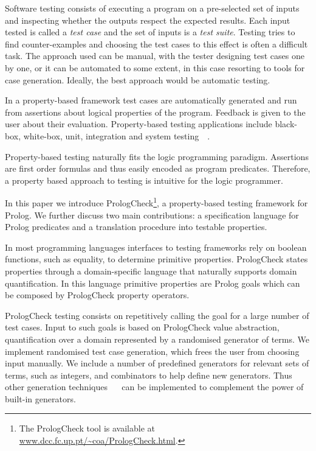 \documentclass[runningheads,a4paper]{llncs}
\newcommand{\Prolog}[0]{{\sf Prolog}}
\newcommand{\plqc}[0]{{\sf PrologCheck}}
\begin{document}
Software testing consists of executing a program on
a pre-selected set of inputs and inspecting whether the outputs
respect the expected results.
%
Each input tested is called a \emph{test case} and the set of inputs is
a \emph{test suite}.
%
Testing tries to find counter-examples and choosing the test cases to
this effect is often a difficult task.
%
The approach used can be  manual, with the tester designing test cases
one by one, or it can be automated to some extent, in this case
resorting to tools for case generation.
%
Ideally, the best approach would be automatic testing.



In a property-based framework test cases are automatically generated and run
from assertions about logical properties of the program.
%
Feedback is given to the user about their evaluation.
%
Property-based testing applications include black-box, white-box, unit,
integration and system
testing~\cite{Boberg-model-based-testing-erl}~\cite{Claessen-ranking-prog-blackbox,Claessen-find-race-cond-erl}.




Property-based testing naturally fits the logic programming paradigm. 
%
Assertions are first order formulas and thus easily encoded as program predicates.
%
Therefore, a property based approach to testing
is intuitive for the
logic programmer.



In this paper we introduce \plqc{}\footnote{The \plqc{} tool is available at \url{www.dcc.fc.up.pt/~coa/PrologCheck.html}.},
a property-based testing framework for \Prolog{}.
%
We further discuss two main contributions: a specification language for \Prolog{} predicates
and a translation procedure into testable properties.



In most programming languages interfaces to testing frameworks rely
on boolean functions, such as equality, to determine primitive properties.
%
\plqc{} states properties through a domain-specific language that
naturally supports domain quantification.
%
In this language primitive properties are \Prolog{} goals which can be
composed by \plqc{} property operators. 



\plqc{} testing consists on repetitively calling the goal for a large number of
test cases.
%
Input to such goals is based on \plqc{} value abstraction,
quantification over a domain represented by a randomised generator of
terms.
%
We implement randomised test case generation, which frees the user
from choosing input manually.
%
We include a number of predefined generators for relevant sets of
terms, such as integers, and combinators to help define new
generators.
%
Thus other generation techniques
\cite{Duregard-2012-feat}~\cite{naylor2007logic}~\cite{runciman2008smallcheck} can be
implemented  to complement the power of built-in generators.
\end{document}
